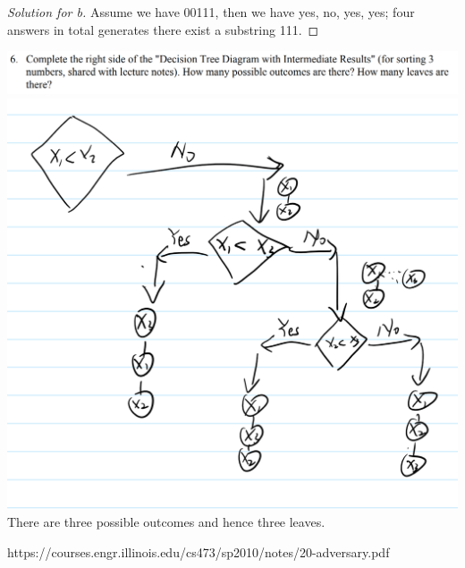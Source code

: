 \documentclass[12pt]{article}
\begin{document}
\begin{proof}[Solution for b]
	Assume we have 00111, then we have yes, no, yes, yes; four answers in total generates there exist a substring 111.
\end{proof}
\includegraphics[scale=0.22]{6.png}
\includegraphics[scale=0.2]{6_a.png}
There are three possible outcomes and hence three leaves.
\begin{thebibliography}{ch}
	https://courses.engr.illinois.edu/cs473/sp2010/notes/20-adversary.pdf
\end{thebibliography}
\end{document}
